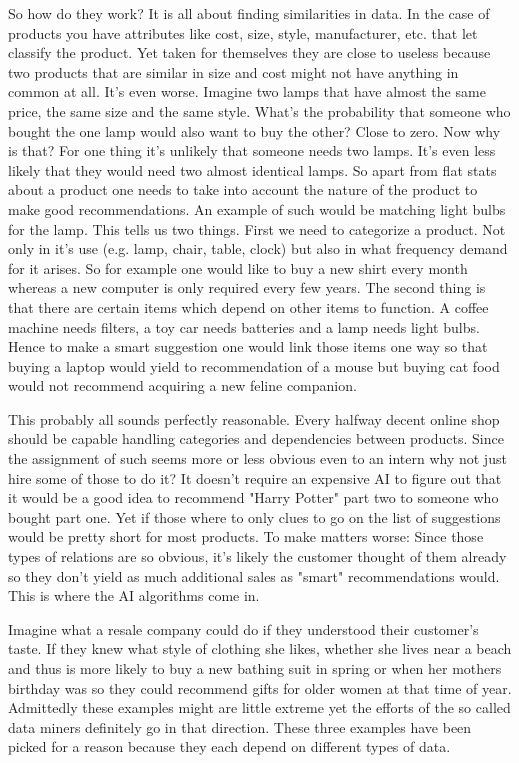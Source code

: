So how do they work? It is all about finding similarities in data. In the case of products you have attributes like cost, size, style, manufacturer, etc. that let classify the product. Yet taken for themselves they are close to useless because two products that are similar in size and cost might not have anything in common at all. It's even worse. Imagine two lamps that have almost the same price, the same size and the same style. What's the probability that someone who bought the one lamp would also want to buy the other? Close to zero. Now why is that? For one thing it's unlikely that someone needs two lamps. It's even less likely that they would need two almost identical lamps. So apart from flat stats about a product one needs to take into account the nature of the product to make good recommendations. An example of such would be matching light bulbs for the lamp. 
This tells us two things. First we need to categorize a product. Not only in it's use (e.g. lamp, chair, table, clock) but also in what frequency demand for it arises. So for example one would like to buy a new shirt every month whereas a new computer is only required every few years. The second thing is that there are certain items which depend on other items to function. A coffee machine needs filters, a toy car needs batteries and a lamp needs light bulbs. Hence to make a smart suggestion one would link those items one way so that buying a laptop would yield to recommendation of a mouse but buying cat food would not recommend acquiring a new feline companion.

This probably all sounds perfectly reasonable. Every halfway decent online shop should be capable handling categories and dependencies between products. Since the assignment of such seems more or less obvious even to an intern why not just hire some of those to do it? It doesn't require an expensive AI to figure out that it would be a good idea to recommend "Harry Potter" part two to someone who bought part one. Yet if those where to only clues to go on the list of suggestions would be pretty short for most products. To make matters worse: Since those types of relations are so obvious, it's likely the customer thought of them already so they don't yield as much additional sales as "smart" recommendations would. This is where the AI algorithms come in.

Imagine what a resale company could do if they understood their customer's taste. If they knew what style of clothing she likes, whether she lives near a beach and thus is more likely to buy a new bathing suit in spring or when her mothers birthday was so they could recommend gifts for older women at that time of year. Admittedly these examples might are little extreme yet the efforts of the so called data miners definitely go in that direction. These three examples have been picked for a reason because they each depend on different types of data.

